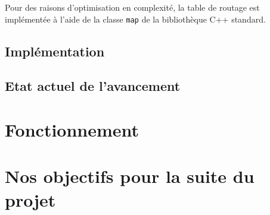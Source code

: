 \documentclass[a4paper,11pt]{article}
\begin{document}
Pour des raisons d'optimisation en complexité, la table de routage est implémentée à l'aide de la classe \texttt{map} de la bibliothèque C++ standard.

\subsection{Implémentation}

\subsection{Etat actuel de l'avancement}

\section{Fonctionnement}

\section{Nos objectifs pour la suite du projet}
\end{document}
